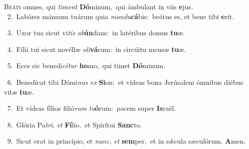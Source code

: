 \lettrine{\initial\textcolor{\initialcolor}{B}}{eáti} omnes, qui \textit{ti}\-\textit{ment} \textbf{Dó}\-minum,~\star qui ámbulant in viis \textbf{e}\-jus.\\
{\numbfont\textcolor{\numbcolor}{~2.}}~Labóres mánuum tuárum quia \textit{man}\-\textit{du}\textbf{cá}bis:~\star beátus es, et bene tibi \textbf{e}\-rit.\par
{\numbfont\textcolor{\numbcolor}{~3.}}~Uxor tua sicut vi\textit{tis} \textit{ab}\-\textbf{ún}dans:~\star in latéribus domus \textbf{tu}\-æ.\par
{\numbfont\textcolor{\numbcolor}{~4.}}~Fílii tui sicut novéllæ \textit{o}\-\textit{li}\textbf{vá}rum:~\star in circúitu mensæ \textbf{tu}\-æ.\par
{\numbfont\textcolor{\numbcolor}{~5.}}~Ecce sic benedi\-\textit{cé}\-\textit{tur} \textbf{ho}\-mo,~\star qui timet \textbf{Dó}\-minum.\par
{\numbfont\textcolor{\numbcolor}{~6.}}~Benedícat tibi Dómi\textit{nus} \textit{ex} \textbf{Si}\-on:~\star et vídeas bona Jerúsalem ómnibus diébus vitæ \textbf{tu}\-æ.\par
{\numbfont\textcolor{\numbcolor}{~7.}}~Et vídeas fílios filió\textit{rum} \textit{tu}\-\textbf{ó}rum:~\star pacem super \textbf{Is}\-raël.\par
{\numbfont\textcolor{\numbcolor}{~8.}}~Glória Pa\-\textit{tri}\-, \textit{et} \textbf{Fí}\-lio,~\star et Spirítui \textbf{Sanc}\-to.\par
{\numbfont\textcolor{\numbcolor}{~9.}}~Sicut erat in princípio, et \textit{nunc}\-, \textit{et} \textbf{sem}\-per,~\star et in sǽcula sæculórum. \textbf{A}\-men.\par
